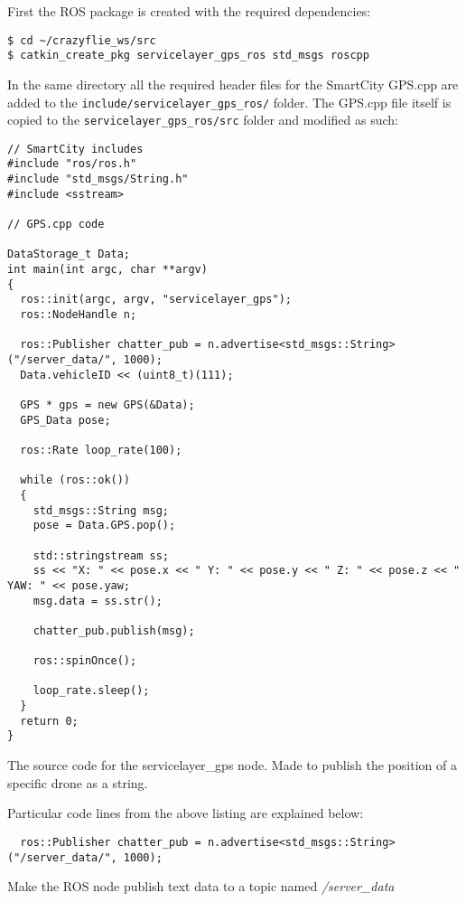 \noindent First the ROS package is created with the required dependencies:
\begin{mdframed}[backgroundcolor=light-gray, linecolor=light-gray]
\begin{verbatim}
$ cd ~/crazyflie_ws/src
$ catkin_create_pkg servicelayer_gps_ros std_msgs roscpp
\end{verbatim}
\end{mdframed}

\noindent In the same directory all the required header files for the SmartCity GPS.cpp are added to the \texttt{include/servicelayer\_gps\_ros/} folder. The GPS.cpp file itself is copied to the \texttt{servicelayer\_gps\_ros/src} folder and modified as such:

\begin{code}
\begin{verbatim}
// SmartCity includes
#include "ros/ros.h"
#include "std_msgs/String.h"
#include <sstream>

// GPS.cpp code

DataStorage_t Data;
int main(int argc, char **argv)
{
  ros::init(argc, argv, "servicelayer_gps");
  ros::NodeHandle n;
  
  ros::Publisher chatter_pub = n.advertise<std_msgs::String>("/server_data/", 1000);
  Data.vehicleID << (uint8_t)(111);

  GPS * gps = new GPS(&Data);
  GPS_Data pose;

  ros::Rate loop_rate(100);

  while (ros::ok())
  {
    std_msgs::String msg;
    pose = Data.GPS.pop();

    std::stringstream ss;
    ss << "X: " << pose.x << " Y: " << pose.y << " Z: " << pose.z << " YAW: " << pose.yaw;
    msg.data = ss.str();

    chatter_pub.publish(msg);

    ros::spinOnce();

    loop_rate.sleep();
  }
  return 0;
}
\end{verbatim}
\caption{The source code for the servicelayer\_gps node. Made to publish the position of a specific drone as a string.\\}
\label{listing:servicelayer_v1}
\end{code}

\noindent Particular code lines from the above listing are explained below:

\begin{verbatim}
  ros::Publisher chatter_pub = n.advertise<std_msgs::String>("/server_data/", 1000);
\end{verbatim}
\noindent Make the ROS node publish text data to a topic named \textit{/server\_data}

